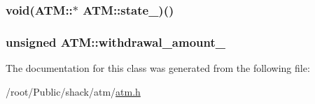 \hypertarget{classATM_ad655bcb7436d78fba4b0d16ab9a15ff1}{
\subsubsection[{state\-\_\-}]{\setlength{\rightskip}{0pt plus 5cm}void(A\-T\-M\-::$\ast$ A\-T\-M\-::state\-\_\-)()\hspace{0.3cm}{\ttfamily [private]}}}\label{classATM_ad655bcb7436d78fba4b0d16ab9a15ff1}
\hypertarget{classATM_a45c2bec3b3f822e15db0304d7ed26529}{
\subsubsection[{withdrawal\-\_\-amount\-\_\-}]{\setlength{\rightskip}{0pt plus 5cm}unsigned A\-T\-M\-::withdrawal\-\_\-amount\-\_\-\hspace{0.3cm}{\ttfamily [private]}}}\label{classATM_a45c2bec3b3f822e15db0304d7ed26529}


The documentation for this class was generated from the following file\-:\begin{DoxyCompactItemize}
\item 
/root/\-Public/shack/atm/\hyperlink{atm_8h}{atm.\-h}\end{DoxyCompactItemize}
